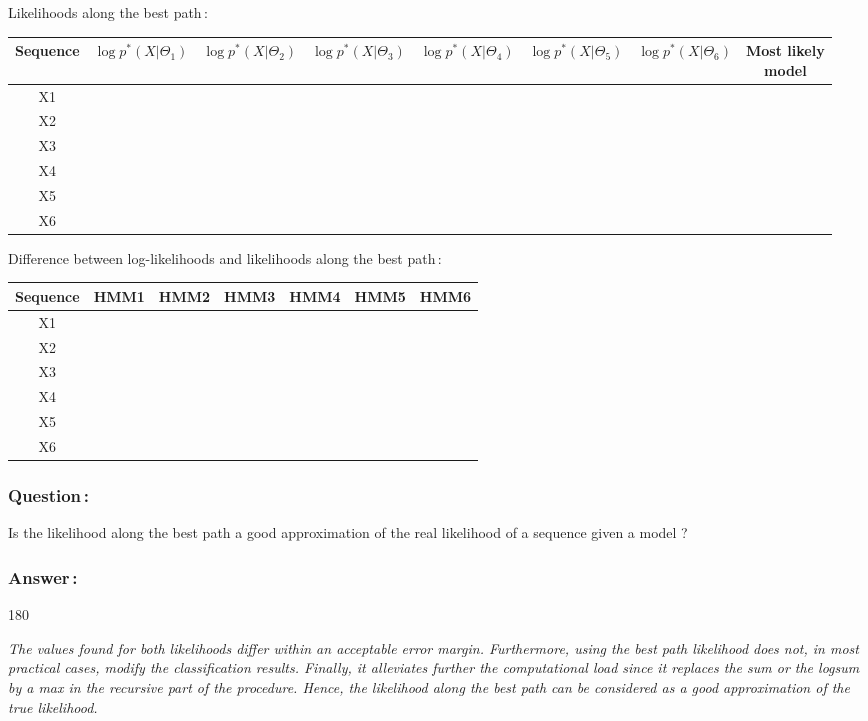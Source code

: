 \documentclass[twoside,a4paper,titlepage]{article}
\newcommand{\expl}[1]{%
\begin{turn}{180}%
\parbox{\textwidth}{\em #1}%
\end{turn}%
}
\begin{document}
\noindent
Likelihoods along the best path\,: \\[0.5em]
\renewcommand{\arraystretch}{1.5}
\begin{tabular}{|c|c|c|c|c|c|c|c|} \hline
 Sequence &
\small $\log p^*(X|\Theta_1)$ & \small $\log p^*(X|\Theta_2)$ &
\small $\log p^*(X|\Theta_3)$ & \small $\log p^*(X|\Theta_4)$ &
\small $\log p^*(X|\Theta_5)$ & \small $\log p^*(X|\Theta_6)$ &
\parbox[c][3em][c]{11ex}{Most likely\\ model} \\ \hline
X1 & & & & & & & \\ \hline
X2 & & & & & & & \\ \hline
X3 & & & & & & & \\ \hline
X4 & & & & & & & \\ \hline
X5 & & & & & & & \\ \hline
X6 & & & & & & & \\ \hline
\end{tabular}

\bigskip

\noindent
Difference between log-likelihoods and likelihoods along the best path\,: \\[0.5em]
\renewcommand{\arraystretch}{1.5}
\begin{tabular}{|c|c|c|c|c|c|c|} \hline
 Sequence &
\small HMM1 & \small HMM2 &
\small HMM3 & \small HMM4 &
\small HMM5 & \small HMM6 \\ \hline
X1 & & & & & & \\ \hline
X2 & & & & & & \\ \hline
X3 & & & & & & \\ \hline
X4 & & & & & & \\ \hline
X5 & & & & & & \\ \hline
X6 & & & & & & \\ \hline
\end{tabular}

\subsubsection*{Question\,:}
Is the likelihood along the best path a good approximation of the real
likelihood of a sequence given a model ?

\subsubsection*{Answer\,:}
\expl{The values found for both likelihoods differ within an acceptable
error margin. Furthermore, using the best path likelihood does not, in most
practical cases, modify the classification results. Finally, it alleviates
further the computational load since it replaces the sum or the logsum by a
max in the recursive part of the procedure. Hence, the likelihood along the
best path can be considered as a good approximation of the true
likelihood.}
\end{document}
